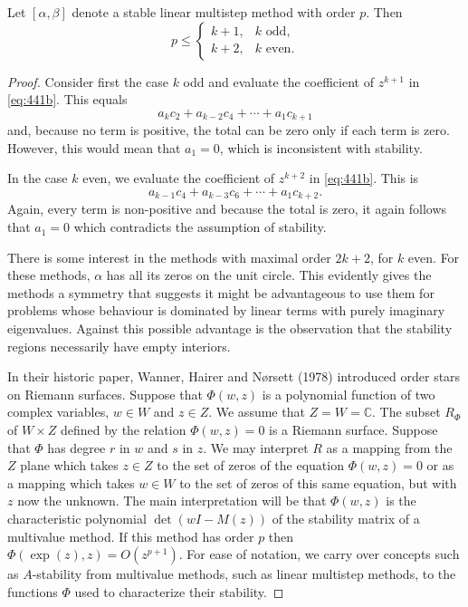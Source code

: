 \begin{theorem}
\begin{theorem}

  \label{thm:441C}
Let $[\alpha, \beta]$ denote a stable linear multistep method with order $p$. Then
\[
p \leq 
\begin{cases}
k + 1, & k \text{ odd}, \\
k + 2, & k \text{ even}.
\end{cases}
\]
\end{theorem}

\begin{proof}
Consider first the case $k$ odd and evaluate the coefficient of $z^{k+1}$ in \eqref{eq:441b}. This equals
\[
a_k c_2 + a_{k-2} c_4 + \cdots + a_1 c_{k+1}
\]
and, because no term is positive, the total can be zero only if each term is zero. However, this would mean that $a_1 = 0$, which is inconsistent with stability.

In the case $k$ even, we evaluate the coefficient of $z^{k+2}$ in \eqref{eq:441b}. This is
\[
a_{k-1} c_4 + a_{k-3} c_6 + \cdots + a_1 c_{k+2}.
\]
Again, every term is non-positive and because the total is zero, it again follows that $a_1 = 0$ which contradicts the assumption of stability.

There is some interest in the methods with maximal order $2k + 2$, for $k$ even. For these methods, $\alpha$ has all its zeros on the unit circle. This evidently gives the methods a symmetry that suggests it might be advantageous to use them for problems whose behaviour is dominated by linear terms with purely imaginary eigenvalues. Against this possible advantage is the observation that the stability regions necessarily have empty interiors.

In their historic paper, Wanner, Hairer and Nørsett (1978) introduced order stars on Riemann surfaces. Suppose that $\Phi(w, z)$ is a polynomial function of two complex variables, $w \in W$ and $z \in Z$. We assume that $Z = W = \mathbb{C}$. The subset $R_\Phi$ of $W \times Z$ defined by the relation $\Phi(w, z) = 0$ is a Riemann surface. Suppose that $\Phi$ has degree $r$ in $w$ and $s$ in $z$. We may interpret $R$ as a mapping from the $Z$ plane which takes $z \in Z$ to the set of zeros of the equation $\Phi(w, z) = 0$ or as a mapping which takes $w \in W$ to the set of zeros of this same equation, but with $z$ now the unknown. The main interpretation will be that $\Phi(w, z)$ is the characteristic polynomial $\det(wI - M(z))$ of the stability matrix of a multivalue method. If this method has order $p$ then $\Phi(\exp(z), z) = O(z^{p+1})$. For ease of notation, we carry over concepts such as $A$-stability from multivalue methods, such as linear multistep methods, to the functions $\Phi$ used to characterize their stability.
\end{proof}


\end{theorem}
